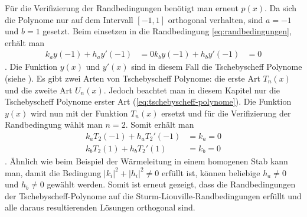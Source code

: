 Für die Verifizierung der Randbedingungen benötigt man erneut $p(x)$.
Da sich die Polynome nur auf dem Intervall $[ -1,1 ]$ orthogonal verhalten, sind $a = -1$ und $b = 1$ gesetzt.
Beim einsetzen in die Randbedingung \ref{eq:randbedingungen}, erhält man
\begin{equation}
\begin{aligned}
	k_a y(-1) + h_a y'(-1) &= 0
	k_b y(-1) + h_b y'(-1) &= 0
\end{aligned} 
\end{equation}.
Die Funktion $y(x)$ und $y'(x)$ sind in diesem Fall die Tschebyscheff Polynome (siehe \label{sub:definiton_der_tschebyscheff-Polynome}).
Es gibt zwei Arten von Tschebyscheff Polynome: die erste Art $T_n(x)$ und die zweite Art $U_n(x)$.
Jedoch beachtet man in diesem Kapitel nur die Tschebyscheff Polynome erster Art (\ref{eq:tschebyscheff-polynome}).
Die Funktion $y(x)$ wird nun mit der Funktion $T_n(x)$ ersetzt und für die Verifizierung der Randbedingung wählt man $n=2$.
Somit erhält man
\begin{equation}
	\begin{aligned}
	k_a T_2(-1) + h_a T_{2}'(-1) &= k_a = 0\\
	k_b T_2(1) + h_b T_{2}'(1) &= k_b = 0
\end{aligned}
\end{equation}.
Ähnlich wie beim Beispiel der Wärmeleitung in einem homogenen Stab kann man, damit die Bedingung $|k_i|^2 + |h_i|^2\ne 0$ erfüllt ist, können beliebige $h_a \ne 0$ und $h_b \ne 0$ gewählt werden.
Somit ist erneut gezeigt, dass die Randbedingungen der Tschebyscheff-Polynome auf die Sturm-Liouville-Randbedingungen erfüllt und alle daraus resultierenden Lösungen orthogonal sind.

 










